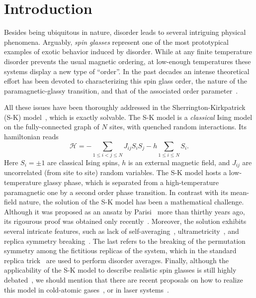 \documentclass[twocolumn,superscriptaddress,prb,10pt]{revtex4-1}
\begin{document}

\maketitle


\section{Introduction}


Besides being ubiquitous in nature, disorder leads to several intriguing 
physical phenomena. 
Arguably, \emph{spin glasses} represent one of the most prototypical examples
of exotic behavior induced by disorder.
While at any finite temperature disorder prevents the 
usual magnetic ordering, at low-enough temperatures these systems display a 
new type of ``order''. In the past decades an intense theoretical 
effort has been devoted to characterizing this spin glass order, the nature of 
the paramagnetic-glassy transition, and that of the associated order 
parameter~\cite{binder-1986,parisi-book,young-1998,nishimori-book,castellani-2005}. 

All these issues have been thoroughly addressed in the Sherrington-Kirkpatrick 
(S-K) model~\cite{sherrington-1978,sherrington-1978-prl}, which is exactly 
solvable. The S-K model is a \emph{classical} Ising model on the fully-connected 
graph of $N$ sites, with quenched random interactions. Its hamiltonian reads  
%
\begin{equation}
{\mathcal H}=-\sum\limits_{1\le i<j\le N}J_{ij}S_i S_j-
h\sum\limits_{1\le i\le N}S_i.
\label{SK-intro}
\end{equation}
%
Here $S_i=\pm 1$ are classical Ising spins, $h$ is an external magnetic field, and 
$J_{ij}$ are uncorrelated (from site to site) random variables. The S-K model hosts 
a low-temperature glassy phase, which is separated from a high-temperature paramagnetic 
one by a second order phase transition. In contrast with its mean-field nature, the 
solution of the S-K model has been a mathematical challenge. 
Although it was proposed as an ansatz by Parisi~\cite{parisi-1980} more than thirthy 
years ago, its rigourous proof was obtained only recently~\cite{talagrand-2006}. Moreover, 
the solution exhibits several intricate features, such as lack of self-averaging~\cite{pastur-1991}, 
ultrametricity~\cite{mezard-1984,rammal-1986}, and replica symmetry breaking~\cite{parisi-book,
castellani-2005}. The last refers to the breaking of the permutation symmetry among the 
fictitious replicas of the system, which in the standard replica trick~\cite{cardy-book} are 
used to perform disorder averages. Finally, although the applicability of the S-K 
model to describe realistic spin glasses is still highly debated~\cite{yucesoy-2012,
billoire-2012,yucesoy-2013}, we should mention that there are recent proposals on how to 
realize this model in cold-atomic gases~\cite{morrison-2008,rotondo-2015}, or in laser 
systems~\cite{ghofraniha-2015}. 
\end{document}
